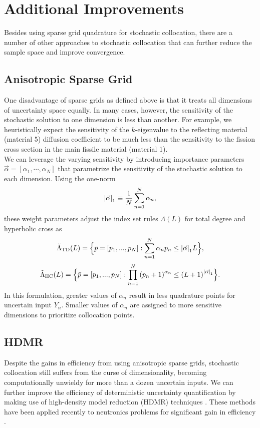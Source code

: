\documentclass[11pt]{article}
\begin{document}
\section{Additional Improvements}
Besides using sparse grid quadrature for stochastic collocation, there are a number of other approaches to stochastic collocation that can further reduce the sample space and improve convergence.

\subsection{Anisotropic Sparse Grid}
One disadvantage of sparse grids as defined above is that it treats all dimensions of uncertainty space equally.  In many cases, however, the sensitivity of the stochastic solution to one dimension is less than another.  For example, we heuristically expect the sensitivity of the $k$-eigenvalue to the reflecting material (material 5) diffusion coefficient to be much less than the sensitivity to the fission cross section in the main fissile material (material 1).  \\

We can leverage the varying sensitivity by introducing importance parameters $\vec\alpha=[\alpha_1,\cdots,\alpha_N]$ that parametrize the sensitivity of the stochastic solution to each dimension.  Using the one-norm
\begin{equation}
\qty|\vec\alpha|_1\equiv\frac{1}{N}\sum_{n=1}^N \alpha_n,
\end{equation}
these weight parameters adjust the index set rules $\Lambda(L)$ for total degree and hyperbolic cross as
\begin{equation}
\tilde\Lambda_\text{TD}(L)=\Big\{\bar p=[p_1,...,p_N]:\sum_{n=1}^N \alpha_n p_n \leq \qty|\vec\alpha|_1 L \Big\},
\end{equation}
\begin{equation}
\tilde\Lambda_\text{HC}(L)=\Big\{\bar p=[p_1,...,p_N]:\prod_{n=1}^N \qty(p_n+1)^{\alpha_n} \leq \qty(L+1)^{\qty|\vec\alpha|_1} \Big\}.
\end{equation}
In this formulation, greater values of $\alpha_n$ result in less quadrature points for uncertain input $Y_n$.  Smaller values of $\alpha_n$ are assigned to more sensitive dimensions to prioritize collocation points.


\subsection{HDMR}
Despite the gains in efficiency from using anisotropic sparse grids, stochastic collocation still suffers from the curse of dimensionality, becoming computationally unwieldy for more than a dozen uncertain inputs.  We can further improve the efficiency of deterministic uncertainty quantification by making use of high-density model reduction (HDMR) techniques \cite{hdmr}.  These methods have been applied recently to neutronics problems for significant gain in efficiency \cite{hdmr_neutron}.\\
\end{document}
